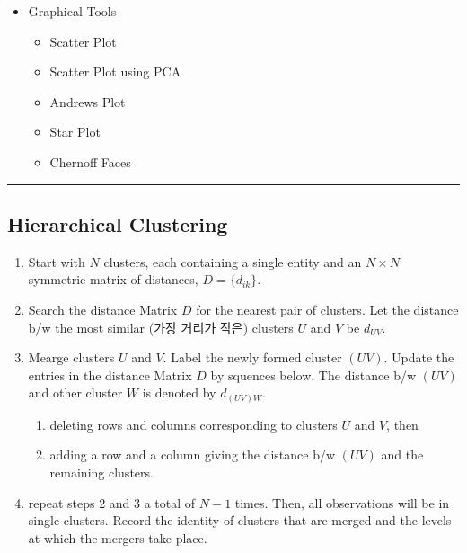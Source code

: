 \documentclass[
]{book}
\providecommand{\tightlist}{%
  \setlength{\itemsep}{0pt}\setlength{\parskip}{0pt}}
\begin{document}
{{{\begin{itemize}
\tightlist
\item
  Graphical Tools

  \begin{itemize}
  \tightlist
  \item
    Scatter Plot
  \item
    Scatter Plot using PCA
  \item
    Andrews Plot
  \item
    Star Plot
  \item
    Chernoff Faces
  \end{itemize}
\end{itemize}

\begin{center}\rule{0.5\linewidth}{0.5pt}\end{center}

\hypertarget{hierarchical-clustering}{%
\subsection{Hierarchical Clustering}\label{hierarchical-clustering}}

\begin{enumerate}
\def\labelenumi{\arabic{enumi}.}
\item
  Start with \(N\) clusters, each containing a single entity and an \(N \times N\) symmetric matrix of distances, \(D=\{d_{ik}\}\).
\item
  Search the distance Matrix \(D\) for the nearest pair of clusters. Let the distance b/w the most similar (가장 거리가 작은) clusters \(U\) and \(V\) be \(d_{UV}\).
\item
  Mearge clusters \(U\) and \(V\). Label the newly formed cluster \((UV)\). Update the entries in the distance Matrix \(D\) by squences below. The distance b/w \((UV)\) and other cluster \(W\) is denoted by \(d_{(UV)W}\).

  \begin{enumerate}
  \def\labelenumii{\arabic{enumii}.}
  \tightlist
  \item
    deleting rows and columns corresponding to clusters \(U\) and \(V\), then
  \item
    adding a row and a column giving the distance b/w \((UV)\) and the remaining clusters.
  \end{enumerate}
\item
  repeat steps 2 and 3 a total of \(N-1\) times. Then, all observations will be in single clusters. Record the identity of clusters that are merged and the levels at which the mergers take place.
\end{enumerate}

}}}
\end{document}
